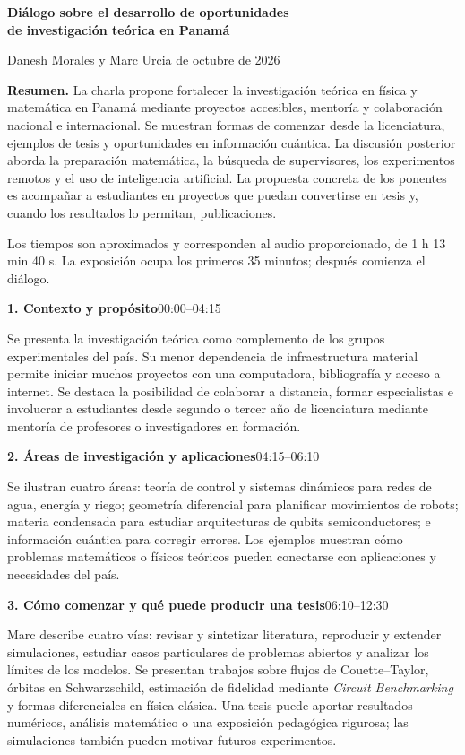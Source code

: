 \documentclass[11pt,a4paper]{article}
\newcommand{\parte}[2]{\par\addvspace{7pt}\Needspace{5\baselineskip}\noindent\textbf{#1}\hfill{\small #2}\par\nobreak}
\begin{document}
{\large\bfseries Diálogo sobre el desarrollo de oportunidades\\ de investigación teórica en Panamá}\par
{\small Danesh Morales y Marc Urcia \enspace\textbullet{} de octubre de 2026}

\textbf{Resumen.} La charla propone fortalecer la investigación teórica en física y matemática en Panamá mediante proyectos accesibles, mentoría y colaboración nacional e internacional. Se muestran formas de comenzar desde la licenciatura, ejemplos de tesis y oportunidades en información cuántica. La discusión posterior aborda la preparación matemática, la búsqueda de supervisores, los experimentos remotos y el uso de inteligencia artificial. La propuesta concreta de los ponentes es acompañar a estudiantes en proyectos que puedan convertirse en tesis y, cuando los resultados lo permitan, publicaciones.

{\small Los tiempos son aproximados y corresponden al audio proporcionado, de 1 h 13 min 40 s. La exposición ocupa los primeros 35 minutos; después comienza el diálogo.}

\parte{1. Contexto y propósito}{00:00--04:15}
Se presenta la investigación teórica como complemento de los grupos experimentales del país. Su menor dependencia de infraestructura material permite iniciar muchos proyectos con una computadora, bibliografía y acceso a internet. Se destaca la posibilidad de colaborar a distancia, formar especialistas e involucrar a estudiantes desde segundo o tercer año de licenciatura mediante mentoría de profesores o investigadores en formación.

\parte{2. Áreas de investigación y aplicaciones}{04:15--06:10}
Se ilustran cuatro áreas: teoría de control y sistemas dinámicos para redes de agua, energía y riego; geometría diferencial para planificar movimientos de robots; materia condensada para estudiar arquitecturas de qubits semiconductores; e información cuántica para corregir errores. Los ejemplos muestran cómo problemas matemáticos o físicos teóricos pueden conectarse con aplicaciones y necesidades del país.

\parte{3. Cómo comenzar y qué puede producir una tesis}{06:10--12:30}
Marc describe cuatro vías: revisar y sintetizar literatura, reproducir y extender simulaciones, estudiar casos particulares de problemas abiertos y analizar los límites de los modelos. Se presentan trabajos sobre flujos de Couette--Taylor, órbitas en Schwarzschild, estimación de fidelidad mediante \emph{Circuit Benchmarking} y formas diferenciales en física clásica. Una tesis puede aportar resultados numéricos, análisis matemático o una exposición pedagógica rigurosa; las simulaciones también pueden motivar futuros experimentos.
\end{document}

